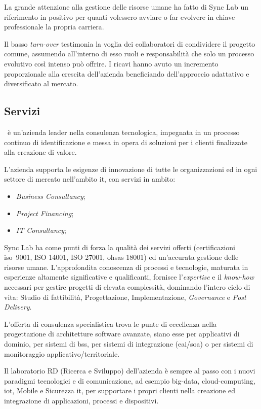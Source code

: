 La grande attenzione alla gestione delle risorse umane ha fatto di Sync Lab un
riferimento in positivo per quanti volessero avviare o far evolvere in chiave professionale la propria carriera.

Il basso \textit{turn-over} testimonia la voglia dei collaboratori di condividere il progetto comune, assumendo all'interno di esso ruoli e responsabilità che solo un processo
evolutivo così intenso può offrire.
I ricavi hanno avuto un incremento proporzionale alla crescita dell'azienda beneficiando dell'approccio adattativo e diversificato al mercato.

\subsection{Servizi}

\myCompany\ è un'azienda leader nella consulenza tecnologica, impegnata in un
processo continuo di identificazione e messa in opera di soluzioni per i clienti finalizzate
alla creazione di valore.

L'azienda supporta le esigenze di innovazione di tutte le
organizzazioni ed in ogni settore di mercato nell'ambito \gls{it}, con
servizi in ambito:
\begin{itemize}
	\item \textit{Business Consultancy};
	\item \textit{Project Financing};
	\item \textit{IT Consultancy};
\end{itemize}

Sync Lab ha come punti di forza la qualità dei servizi offerti (certificazioni \acrshort{iso}\gloss\ 9001,
ISO 14001, ISO 27001, \acrshort{ohsas} 18001) ed un'accurata gestione delle risorse umane.
L'approfondita conoscenza di processi e tecnologie, maturata in esperienze altamente
significative e qualificanti, fornisce l'\textit{expertise} e il \textit{know-how} necessari per gestire
progetti di elevata complessità, dominando l'intero ciclo di vita: Studio di fattibilità,
Progettazione, Implementazione, \textit{Governance} e \textit{Post Delivery}.

L'offerta di consulenza specialistica trova le punte di eccellenza nella progettazione di
architetture software avanzate, siano esse per applicativi di dominio, per sistemi di
\gls{bss}, per sistemi di integrazione (\acrshort{eai}/\acrshort{soa}) o per sistemi di
monitoraggio applicativo/territoriale.

Il laboratorio RD (Ricerca e Sviluppo) dell'azienda è sempre al passo con i nuovi
paradigmi tecnologici e di comunicazione, ad esempio \gls{big-data}\gloss, \gls{cloud-computing}\gloss,
\gls{iot}\gloss, Mobile e Sicurezza \acrshort{it}, per supportare i propri clienti nella creazione
ed integrazione di applicazioni, processi e dispositivi.

